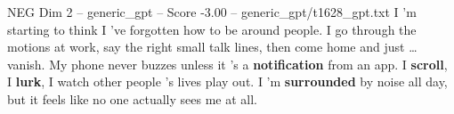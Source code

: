 \begin{textsample}{NEG Dim 2 – generic\_gpt – Score -3.00 – generic\_gpt/t1628\_gpt.txt}  \label{ex:f2_neg_002}
I ’m starting to think I ’ve forgotten how to be around people.
I go through the motions at work, say the right small talk lines, then come home and just … vanish.
My phone never buzzes unless it ’s a \textbf{notification} from an app.
I \textbf{scroll}, I \textbf{lurk}, I watch other people ’s lives play out.
I ’m \textbf{surrounded} by noise all day, but it feels like no one actually sees me at all.

\end{textsample}
